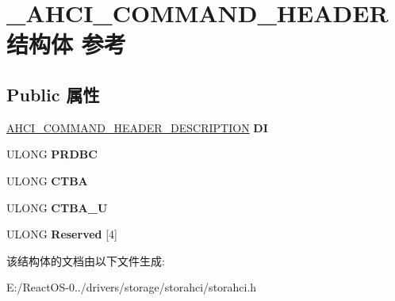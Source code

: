 \hypertarget{struct___a_h_c_i___c_o_m_m_a_n_d___h_e_a_d_e_r}{}\section{\+\_\+\+A\+H\+C\+I\+\_\+\+C\+O\+M\+M\+A\+N\+D\+\_\+\+H\+E\+A\+D\+E\+R结构体 参考}
\label{struct___a_h_c_i___c_o_m_m_a_n_d___h_e_a_d_e_r}
\subsection*{Public 属性}
\begin{DoxyCompactItemize}
\item 
\mbox{\label{struct___a_h_c_i___c_o_m_m_a_n_d___h_e_a_d_e_r_a81be8e02a64b16aada80b26610a3a052}} 
\hyperlink{union___a_h_c_i___c_o_m_m_a_n_d___h_e_a_d_e_r___d_e_s_c_r_i_p_t_i_o_n}{A\+H\+C\+I\+\_\+\+C\+O\+M\+M\+A\+N\+D\+\_\+\+H\+E\+A\+D\+E\+R\+\_\+\+D\+E\+S\+C\+R\+I\+P\+T\+I\+ON} {\bfseries DI}
\item 
\mbox{\label{struct___a_h_c_i___c_o_m_m_a_n_d___h_e_a_d_e_r_a8c1b1c4a9c6085d003da5fee0e1f4814}} 
U\+L\+O\+NG {\bfseries P\+R\+D\+BC}
\item 
\mbox{\label{struct___a_h_c_i___c_o_m_m_a_n_d___h_e_a_d_e_r_a537916196efe01429c62dbadf961f84e}} 
U\+L\+O\+NG {\bfseries C\+T\+BA}
\item 
\mbox{\label{struct___a_h_c_i___c_o_m_m_a_n_d___h_e_a_d_e_r_a5060c866be85961513e4dda4fb1883b2}} 
U\+L\+O\+NG {\bfseries C\+T\+B\+A\+\_\+U}
\item 
\mbox{\label{struct___a_h_c_i___c_o_m_m_a_n_d___h_e_a_d_e_r_a96f901c7a954ee2fb3708bcc49bc0ff7}} 
U\+L\+O\+NG {\bfseries Reserved} \mbox{[}4\mbox{]}
\end{DoxyCompactItemize}


该结构体的文档由以下文件生成\+:\begin{DoxyCompactItemize}
\item 
E\+:/\+React\+O\+S-\/0../drivers/storage/storahci/storahci.\+h\end{DoxyCompactItemize}
